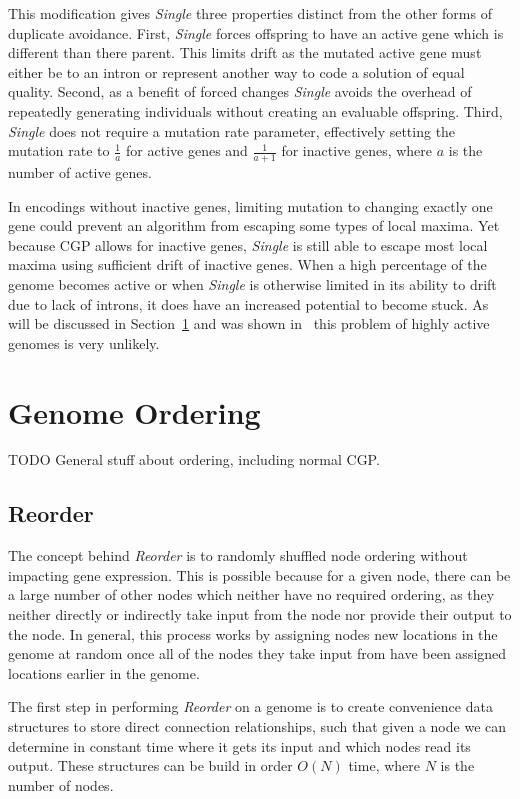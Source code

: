 \documentclass[journal]{IEEEtran}
\begin{document}
This modification gives \emph{Single} three properties distinct from the other
forms of duplicate avoidance.  First, \emph{Single} forces offspring to have
an active gene which is different than there parent.  This limits drift as the
mutated active gene must either be to an intron or represent another way to
code a solution of equal quality.  Second, as a benefit of forced changes
\emph{Single} avoids the overhead of repeatedly generating individuals without
creating an evaluable offspring.  Third, \emph{Single} does not require a mutation
rate parameter, effectively setting the mutation rate to $\frac{1}{a}$ for active
genes and $\frac{1}{a+1}$ for inactive genes, where $a$ is the number of active genes.

In encodings without inactive genes, limiting mutation to changing exactly one gene
could prevent an algorithm from escaping some types of local maxima.  Yet because
CGP allows for inactive genes, \emph{Single} is still able to escape most local
maxima using sufficient drift of inactive genes.  When a high percentage of
the genome becomes active or when \emph{Single} is otherwise limited in its ability
to drift due to lack of introns, it does have an increased potential to become stuck.
As will be discussed in Section~\ref{sec-ordering} and was shown in~\cite{goldman:2013:ordering}
this problem of highly active genomes is very unlikely.

\section{Genome Ordering}
\label{sec-ordering}
TODO General stuff about ordering, including normal CGP.


\subsection{Reorder}
\label{sec:reorder}
The concept behind \emph{Reorder} is to randomly shuffled node ordering without
impacting gene expression.  This is possible because for a given node, there can
be a large number of other nodes which neither have no required ordering,
as they neither directly or indirectly take input from the node nor provide their
output to the node.  In general, this process works by assigning nodes new
locations in the genome at random once all of the nodes they take input from have been assigned
locations earlier in the genome.

The first step in performing \emph{Reorder} on a genome is to create convenience
data structures to store direct connection relationships, such that given a node
we can determine in constant time where it gets its input and which nodes read
its output.  These structures can be build in order $O(N)$ time, where $N$ is the
number of nodes.
\end{document}
